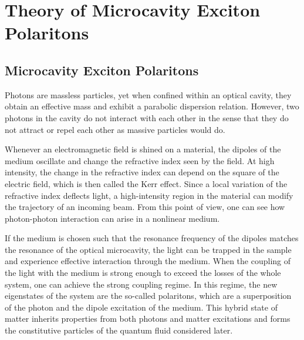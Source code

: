 
\newcommand{\kperp}{\mathbf{k}_\perp}
\newcommand{\rperp}{\mathbf{r}_\perp}
\newcommand{\Ehat}{\hat{\mathcal{E}}}
\newcommand{\dEhat}{\delta\hat{\mathcal{E}}}
\newcommand{\ak}{\hat{a}_{\mathbf{k}_\perp}}
\newcommand{\akdag}{\hat{a}^\dagger_{\mathbf{k}_\perp}}
\newcommand{\amk}{\hat{a}_{-\mathbf{k}_\perp}}
\newcommand{\amkdag}{\hat{a}^\dagger_{-\mathbf{k}_\perp}}
\newcommand{\bk}{\hat{b}_{\mathbf{k}_\perp}}
\newcommand{\bkdag}{\hat{b}^\dagger_{\mathbf{k}_\perp}}
\newcommand{\bmk}{\hat{b}_{-\mathbf{k}_\perp}}
\newcommand{\bmkdag}{\hat{b}^\dagger_{-\mathbf{k}_\perp}}
\newcommand{\Vintra}{\dfrac{4\pi e^2}{L^3q^2\epsilon_{sc}}}

\graphicspath{{./}{./fig/}{./chap1/fig/}}




\part{Theory of Microcavity Exciton Polaritons}


\chapter{Microcavity Exciton Polaritons}\label{chap:polariton_theory}

Photons are massless particles, yet when confined within an optical cavity, they obtain an effective mass and exhibit a parabolic dispersion relation. However, two photons in the cavity do not interact with each other in the sense that they do not attract or repel each other as massive particles would do.

Whenever an electromagnetic field is shined on a material, the dipoles of the medium oscillate and change the refractive index seen by the field. At high intensity, the change in the refractive index can depend on the square of the electric field, which is then called the Kerr effect. Since a local variation of the refractive index deflects light, a high-intensity region in the material can modify the trajectory of an incoming beam. From this point of view, one can see how photon-photon interaction can arise in a nonlinear medium.

If the medium is chosen such that the resonance frequency of the dipoles matches the resonance of the optical microcavity, the light can be trapped in the sample and experience effective interaction through the medium. When the coupling of the light with the medium is strong enough to exceed the losses of the whole system, one can achieve the strong coupling regime. In this regime, the new eigenstates of the system are the so-called polaritons, which are a superposition of the photon and the dipole excitation of the medium. This hybrid state of matter inherits properties from both photons and matter excitations and forms the constitutive particles of the quantum fluid considered later.


